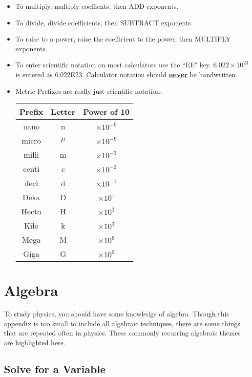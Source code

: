 \begin{itemize}
		\item To multiply, multiply coeffients, then ADD exponents.
		\item To divide, divide coefficients, then SUBTRACT exponents.
		\item To raise to a power, raise the coefficient to the power, then MULTIPLY exponents.
		\item To enter scientific notation on most calculators use the ``EE" key. $6.022 \times 10^{23}$ is entered as 6.022\scriptsize E\normalsize23.  Calculator notation should \underline{\textbf{never}} be handwritten. 
		\item Metric Prefixes are really just scientific notation:
		\begin{center}
			\begin{tabular}{|c|c|c|}
				\hline
				Prefix & Letter & Power of 10 \\
				\hline
				nano & n &  $ \times 10^{-9}$ \\
				\hline
				micro & $\mu$ &  $ \times 10^{-6}$ \\
				\hline
				milli & m & $ \times 10^{-3}$ \\
				\hline
				centi & c & $ \times 10^{-2}$ \\
				\hline
				deci & d & $ \times 10^{-1}$ \\
				\hline
				Deka & D & $ \times 10^{1}$ \\
				\hline
				Hecto & H & $ \times 10^{2}$ \\
				\hline
				Kilo & k & $ \times 10^{3}$ \\
				\hline
				Mega & M & $ \times 10^{6}$ \\
				\hline
				Giga & G & $ \times 10^{9}$ \\
				\hline
				
			\end{tabular}	
		\end{center}
		
		
	\end{itemize}
\newpage

\section{Algebra}
To study physics, you should have some knowledge of algebra. Though this appendix is too small to include all algebraic techniques, there are some things that are repeated often in physics. These commonly recurring algebraic themes are highlighted here.

\subsection{Solve for a Variable}

